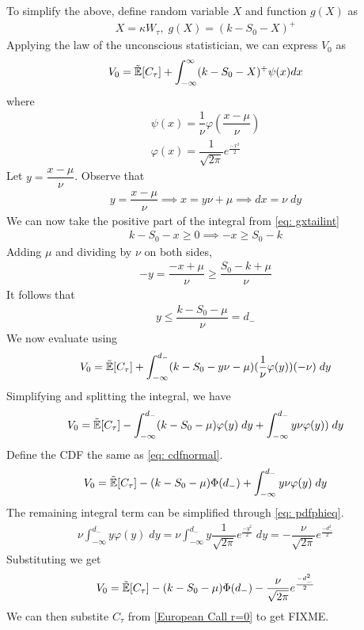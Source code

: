 \documentclass[reqno]{amsart}
\begin{document}
To simplify the above, define random variable $X$ and function $g(X)$ as 
\begin{align} 
     X = \kappa W_\tau, \;g(X) = (k - S_0 - X)^+
\end{align}
Applying the law of the unconscious statistician, we can express $V_0$ as 
\begin{align} \label{eq: gxtailint}
     V_0 = \tilde{\mathbb{E}}[C_\tau] + \int_{-\infty}^{\infty} (k - S_0 - X)^+ \psi(x) dx
\end{align}
where
\begin{align} 
     \psi(x) = \dfrac{1}{\nu} \varphi \left( \dfrac{x - \mu}{\nu} \right)\\
     \label{eq: pdfphieq}
     \varphi(x) = \dfrac{1}{\sqrt{2\pi}} e^\frac{-x^2}{2}
\end{align}
Let $y = \dfrac{x - \mu}{\nu}$. Observe that
\begin{align} \label{eq: ysubst}
     y = \dfrac{x - \mu}{\nu} \implies x = y\nu + \mu \implies dx = \nu \;dy
\end{align}
We can now take the positive part of the integral from \eqref{eq: gxtailint}
\begin{align}
     k - S_0 - x \geq 0 \implies -x \geq S_0 - k
\end{align}
Adding $\mu$ and dividing by $\nu$ on both sides,
\begin{align}
     -y = \dfrac{-x + \mu}{\nu} \geq \dfrac{S_0 - k + \mu}{\nu}
\end{align}
It follows that 
\begin{align}
     y \leq \dfrac{k - S_0 - \mu}{\nu} = d_-
\end{align}
We now evaluate  using 
\begin{align} 
     V_0 = \tilde{\mathbb{E}}[C_\tau] + \int_{-\infty}^{d_-} (k - S_0 - y\nu - \mu) (\dfrac{1}{\nu} \varphi(y)) (-\nu) \;dy
\end{align}
Simplifying and splitting the integral, we have
\begin{align} 
     V_0 = \tilde{\mathbb{E}}[C_\tau] - \int_{-\infty}^{d_-} (k - S_0 - \mu) \varphi(y) \;dy + \int_{-\infty}^{d_-} y\nu \varphi(y)) \;dy
\end{align}
Define the CDF the same as \eqref{eq: cdfnormal}. 
\begin{align} 
     V_0 = \tilde{\mathbb{E}}[C_\tau] - (k - S_0 - \mu) \Phi(d_-) + \int_{-\infty}^{d_-} y\nu \varphi(y) \;dy
\end{align}
The remaining integral term can be simplified through \eqref{eq: pdfphieq}.
\begin{align} 
     \nu \int_{-\infty}^{d_-} y \varphi(y) \;dy = \nu \int_{-\infty}^{d_-} y \dfrac{1}{\sqrt{2\pi}} e^{\frac{-y^2}{2}} \;dy = -\dfrac{\nu}{\sqrt{2\pi}} e^{\frac{-d_-^2}{2}}
\end{align}
Substituting we get
\begin{align} 
     V_0 = \tilde{\mathbb{E}}[C_\tau] - (k - S_0 - \mu) \Phi(d_-) -\dfrac{\nu}{\sqrt{2\pi}} e^{\frac{-d_-^2}{2}}
\end{align}
We can then substite $C_\tau$ from \eqref{European Call r=0} to get FIXME.
\end{document}
